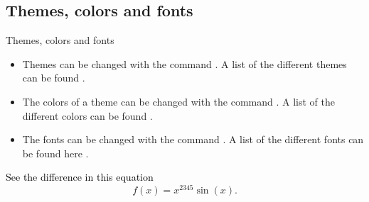 \documentclass{beamer}
\begin{document}

\begin{frame}
\centering
{}
\end{frame}

\begin{frame}
\end{frame}

\begin{frame}
\end{frame}

\begin{frame}
\end{frame}



\subsection[Themes]{Themes, colors and fonts}

\begin{frame}{Themes, colors and fonts}
\begin{itemize}
	\item 
		Themes can be changed with the command . \pause 
		A list of the different themes can be found . \pause
	\item 
		The colors of a theme can be changed with the command . \pause
		A list of the different colors can be found . \pause
	\item 
		The fonts can be changed with the command . \pause
		A list of the different fonts can be found here . \pause
\end{itemize}
\textcolor{black}{See the difference in this equation}
\begin{equation}
	f(x) = x^{2345}\sin(x) .
\end{equation}
\end{frame}
\end{document}
